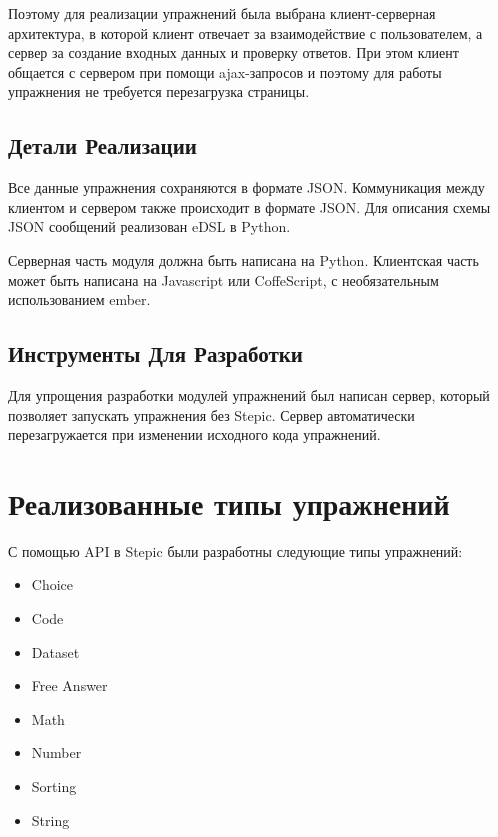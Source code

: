 \documentclass{matmex-diploma-custom}
\begin{document}
Поэтому для реализации упражнений была выбрана клиент-серверная
архитектура, в которой клиент отвечает за взаимодействие с
пользователем, а сервер за создание входных данных и проверку
ответов. При этом клиент общается с сервером при помощи ajax-запросов
и поэтому для работы упражнения не требуется перезагрузка страницы.

\subsection{Детали Реализации}

Все данные упражнения сохраняются в формате JSON. Коммуникация между
клиентом и сервером также происходит в формате JSON. Для описания
схемы JSON сообщений реализован eDSL в Python.

Серверная часть модуля должна быть написана на Python.
Клиентская часть может быть написана на Javascript или CoffeScript,
с необязательным использованием ember.

\subsection{Инструменты Для Разработки}
Для упрощения разработки модулей упражнений был написан сервер,
который позволяет запускать упражнения без Stepic. Сервер
автоматически перезагружается при изменении исходного кода упражнений.

\section{Реализованные типы упражнений}

С помощью API в Stepic были разработны следующие типы упражнений:
\begin{itemize}
\item Choice
\item Code
\item Dataset
\item Free Answer
\item Math
\item Number
\item Sorting
\item String
\end{itemize}
\end{document}
